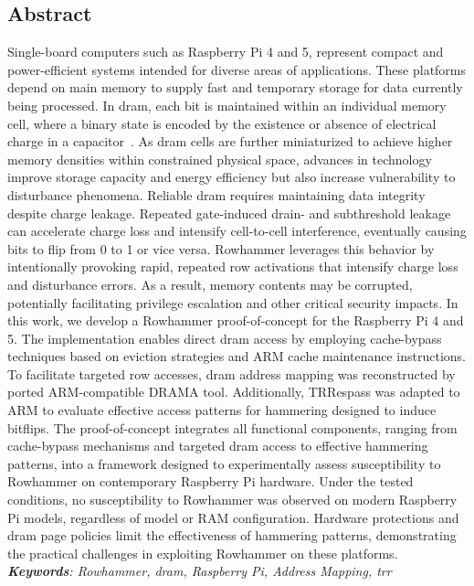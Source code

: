\begin{titlepage}
    \section*{Abstract}
        Single-board computers such as Raspberry Pi 4 and 5, represent compact 
        and power-efficient systems intended for diverse areas of applications. 
        These platforms depend on main memory to supply fast and temporary storage 
        for data currently being processed. In \gls{dram}, each bit is maintained within 
        an individual memory cell, where a binary state is encoded by the existence 
        or absence of electrical charge in a capacitor~\cite{paperFlippingBits, paperRowhammeronaRPi, paperDrammer}.
        As \gls{dram} cells are further miniaturized to achieve higher memory densities 
        within constrained physical space, advances in technology improve storage 
        capacity and energy efficiency but also increase vulnerability to disturbance 
        phenomena. Reliable \gls{dram} requires maintaining data integrity despite charge 
        leakage. Repeated gate-induced drain- and subthreshold leakage~\cite{paperFlippingBits, paperRHinDRAM} can 
        accelerate charge loss and intensify cell-to-cell interference, eventually 
        causing bits to flip from 0 to 1 or vice versa. Rowhammer leverages this 
        behavior by intentionally provoking rapid, repeated row activations that 
        intensify charge loss and disturbance errors. As a result, memory contents 
        may be corrupted, potentially facilitating privilege escalation and other 
        critical security impacts.
        In this work, we develop a Rowhammer proof-of-concept for the Raspberry 
        Pi 4 and 5. The implementation enables direct \gls{dram} access by employing cache-bypass 
        techniques based on eviction strategies and ARM cache maintenance instructions.
        To facilitate targeted row accesses, \gls{dram} address mapping was reconstructed by ported 
        ARM-compatible DRAMA tool.
        Additionally, \mbox{TRRespass} was adapted to ARM to evaluate effective access patterns 
        for hammering designed to induce bitflips.
        The proof-of-concept integrates all functional components, ranging from 
        cache-bypass mechanisms and targeted \gls{dram} access to effective hammering 
        patterns, into a framework designed to experimentally assess susceptibility 
        to Rowhammer on contemporary Raspberry Pi hardware. 
        Under the tested conditions, no susceptibility to Rowhammer was observed on modern Raspberry Pi
        models, regardless of model or RAM configuration. Hardware protections and \gls{dram} page 
        policies limit the effectiveness of hammering patterns, demonstrating the 
        practical challenges in exploiting Rowhammer on these platforms.
        \\
        \textit{\textbf{Keywords}: Rowhammer, \gls{dram}, Raspberry Pi, Address Mapping, \gls{trr}}
\end{titlepage}

